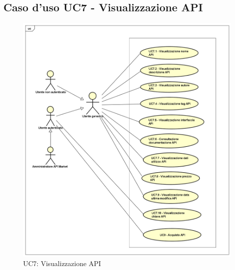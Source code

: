\newpage
\subsection{Caso d'uso UC7 - Visualizzazione API}
\label{UC7}
\begin{figure}[ht]
	\centering
	\includegraphics[scale=0.45]{UML/UC7.png}
	\caption{UC7: Visualizzazione API}
\end{figure}

